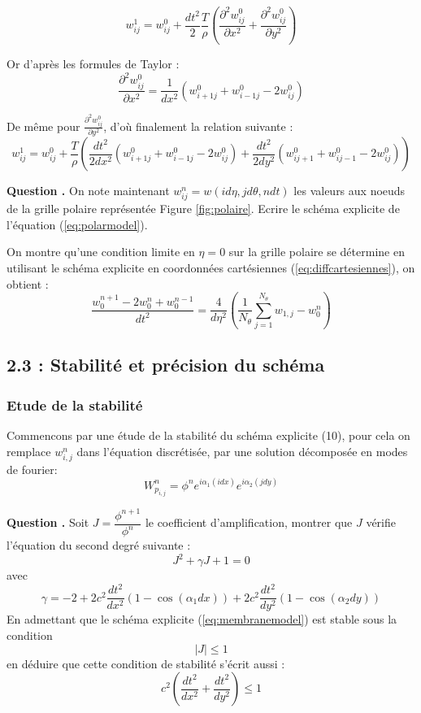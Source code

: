 \documentclass[a4,12pt]{article}
\newcounter{Nbquestion}
\newcommand*\question{%
  \stepcounter{Nbquestion}%
  \textbf{Question \theNbquestion. }}
\begin{document}
			      \[
				w_{ij}^1 = w_{ij}^0 +
				\frac{dt^2}{2}\frac{T}{\rho}\left(\frac{\partial^2 w_{ij}^0}{\partial x^2} +
				\frac{\partial^2 w_{ij}^0}{\partial y^2} \right)
			      \]

			      Or d'après les formules de Taylor :
			      \[
				\frac{\partial^2
				  w_{ij}^0}{\partial x^2} = \frac{1}{dx^2}(w_{i+1 j}^0 + w_{i-1 j}^0 -2w_{i j}^0)
				\]

				De même pour $\frac{\partial^2 w_{ij}^0}{\partial y^2}$, d'où finalement la relation suivante :
				\[
				  w_{ij}^1 = w_{ij}^0 + \frac{T}{\rho}\left(\frac{dt^2}{2dx^2}(w_{i+1 j}^0 + w_{i-1 j}^0 -2w_{i j}^0)+\frac{dt^2}{2dy^2}(w_{i j+1}^0 + w_{i j-1}^0 -2w_{i j}^0)\right) 
				\]




				\question On note maintenant $w_{ij}^{n}=w(id\eta,jd\theta,ndt)$ les valeurs aux noeuds de la grille polaire représentée Figure \ref{fig:polaire}. Ecrire le schéma explicite de l'équation (\ref{eq:polarmodel}).


				On montre qu'une condition limite en $\eta=0$ sur la grille polaire se détermine en utilisant le schéma explicite en coordonnées cartésiennes (\ref{eq:diffcartesiennes}), on obtient :
				\[
				  \dfrac{w_0^{n+1}-2 w_0^{n}+ w_{0}^{n-1}}{dt^2}=\dfrac{4}{d \eta^2}\left(\frac{1}{N_\theta} \sum_{j=1}^{N_\theta} w_{1,j}-w_{0}^{n}\right)
				\]

				\subsection*{2.3 : Stabilité et précision du schéma}

				\subsubsection{Etude de la stabilité}
				Commencons par une étude de la stabilité du schéma explicite (10), pour cela on remplace $w_{i,j}^{n}$ dans l'équation discrétisée, par une solution décomposée en modes de fourier: 
				\[
				  W_{p_{i,j}}^{n}=\phi^n e^{i\alpha_1(idx)}e^{i\alpha_2(jdy)}
				\]


				\question Soit $J=\dfrac{\phi^{n+1}}{\phi^n}$ le coefficient d'amplification, montrer que $J$ vérifie l'équation du second degré suivante : 
				\[
				  J^2+\gamma J+1=0
				\]
				avec 
				\[
				  \gamma=-2+2c^2\dfrac{dt^2}{dx^2}(1-\cos(\alpha_1dx))+2c^2\dfrac{dt^2}{dy^2}(1-\cos(\alpha_2dy))
				\]
				En admettant que le schéma explicite (\ref{eq:membranemodel}) est stable sous la condition 
				\[
				  \vert J \vert \leq 1
				\]
				en déduire que cette condition de stabilité s'écrit aussi :
				\[
				  c^2\left(\dfrac{dt^2}{dx^2}+\dfrac{dt^2}{dy^2}\right)\leq 1
				\]
\end{document}
